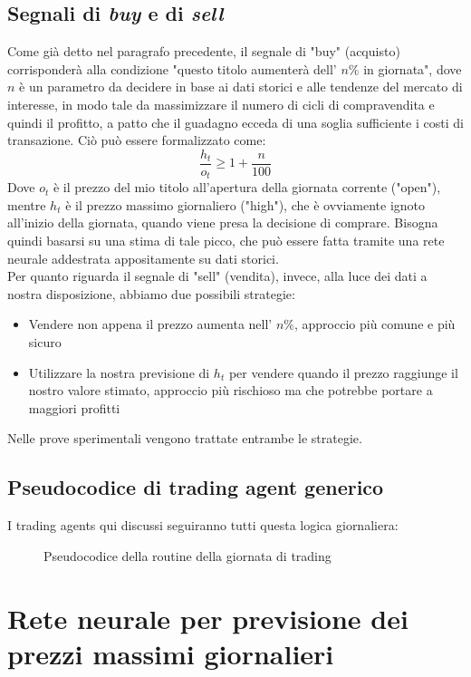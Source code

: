 \documentclass[binding=0.6cm]{sapthesis}
\begin{document}
		\section{Segnali di \textit{buy} e di \textit{sell}}
			Come già detto nel paragrafo precedente, il segnale di "buy" (acquisto) corrisponderà alla condizione "questo titolo aumenterà dell' $n\%$ in giornata", dove $n$ è un parametro da decidere
			in base ai dati storici e alle tendenze del mercato di interesse, in modo tale da massimizzare il numero di cicli di compravendita e quindi il profitto, a patto che il guadagno ecceda di
			una soglia sufficiente i costi di transazione. Ciò può essere formalizzato come:
			\[ \frac{h_t}{o_t} \geq 1 + \frac{n}{100} \]
			Dove $o_t$ è il prezzo del mio titolo all'apertura della giornata corrente ("open"), mentre $h_t$ è il prezzo massimo giornaliero ("high"), che è ovviamente ignoto all'inizio della giornata,
			quando viene presa la decisione di comprare. Bisogna quindi basarsi su una stima di tale picco, che può essere fatta tramite una rete neurale addestrata appositamente su dati storici. \\
			Per quanto riguarda il segnale di "sell" (vendita), invece, alla luce dei dati a nostra disposizione, abbiamo due possibili strategie:
			\begin{itemize}
				\item Vendere non appena il prezzo aumenta nell' $n\%$, approccio più comune e più sicuro
				\item Utilizzare la nostra previsione di $h_t$ per vendere quando il prezzo raggiunge il nostro valore stimato, approccio più rischioso ma che potrebbe portare a maggiori profitti
			\end{itemize}
			Nelle prove sperimentali vengono trattate entrambe le strategie.
		\newpage
		\section{Pseudocodice di trading agent generico}
			I trading agents qui discussi seguiranno tutti questa logica giornaliera:
			\begin{figure}[H]
			{
				\begin{codebox}
				\end{codebox}
				\caption{Pseudocodice della routine della giornata di trading}
			}
			\end{figure}
	\chapter{Rete neurale per previsione dei prezzi massimi giornalieri}
\end{document}
